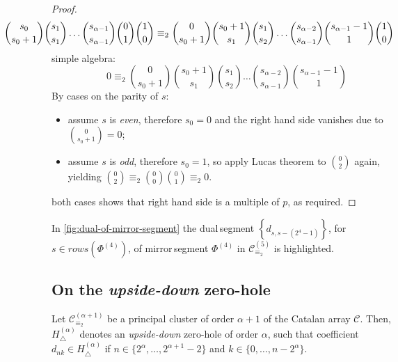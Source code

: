 \begin{proof}
    \begin{displaymath}
        \hspace{-2cm}
        {{s_{0}}\choose{s_{0}+1}}
        {{s_{1}}\choose{s_{1}}}
        \ldots
        {{s_{\alpha-1}}\choose{s_{\alpha-1}}}
        {{0}\choose{1}}
        {{1}\choose{0}}
        \equiv_{2}
        {{0}\choose{s_{0}+1}}
        {{s_{0}+1}\choose{s_{1}}}
        {{s_{1}}\choose{s_{2}}}
        \ldots
        {{s_{\alpha-2}}\choose{s_{\alpha-1}}}
        {{s_{\alpha-1}-1}\choose{1}}
        {{1}\choose{0}}
    \end{displaymath}
    simple algebra:
    \begin{displaymath}
        0
        \equiv_{2}
        {{0}\choose{s_{0}+1}}
        {{s_{0}+1}\choose{s_{1}}}
        {{s_{1}}\choose{s_{2}}}
        \ldots
        {{s_{\alpha-2}}\choose{s_{\alpha-1}}}
        {{s_{\alpha-1}-1}\choose{1}}
    \end{displaymath}
    By cases on the parity of $s$:
    \begin{itemize}
        \item assume $s$ is \emph{even}, therefore $s_{0}=0$ and the right hand side vanishes due to ${{0}\choose{s_{0}+1}}=0$;
        \item assume $s$ is \emph{odd}, therefore $s_{0}=1$, so apply Lucas theorem to ${{0}\choose{2}}$ again,
            yielding ${{0}\choose{2}}\equiv_{2}{{0}\choose{0}}{{0}\choose{1}}\equiv_{2}0$.
    \end{itemize}
    both cases shows that right hand side is a multiple of $p$, as required.
\end{proof}


In \autoref{fig:dual-of-mirror-segment} the \flqq dual\frqq\,segment 
    $\left\lbrace d_{s,s-(2^{4}-1)}\right\rbrace$,
    for $s\in rows\left(\Phi^{(4)}\right)$, of \flqq mirror\frqq\,segment 
    $\Phi^{(4)}$ in $\mathcal{C}_{\equiv_{2}}^{(5)}$ is highlighted.

\subsection{On the \emph{upside-down} zero-hole}

\begin{theorem}
    Let $\mathcal{C}_{\equiv_{2}}^{(\alpha+1)}$ be a principal cluster 
    of order $\alpha+1$ of the Catalan array $\mathcal{C}$. Then, 
    $H_{\bigtriangleup}^{({\alpha})}$ denotes an \emph{upside-down} zero-hole of order $\alpha$,
    such that coefficient $d_{nk}\in H_{\bigtriangleup}^{({\alpha})}$ if 
    $n\in\lbrace 2^{{\alpha}},\ldots,2^{{\alpha}+1}-2\rbrace$ and 
    $k\in\lbrace 0,\ldots, n-2^{{\alpha}}\rbrace$. 
\end{theorem}

